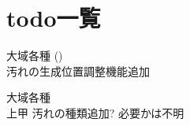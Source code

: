 \chapter{todo一覧}
\hypertarget{todo}{}\label{todo}

\begin{DoxyRefList}
\item[大域各種 \doxylink{class_cleaning_event_a301dcc3ca6ee5df165160a24ea37d762}{Cleaning\+Event.Create\+Dirt} ()]\hfill \\
\label{todo__todo000002}%
%
汚れの生成位置調整機能追加  
\item[大域各種 \doxylink{class_cleaning_event_adb5aec8c82243d1878201d30ca1839d1}{Cleaning\+Event.m\+\_\+dirt\+Prefab} ]\hfill \\
\label{todo__todo000001}%
%
上甲 汚れの種類追加? 必要かは不明 
\end{DoxyRefList}